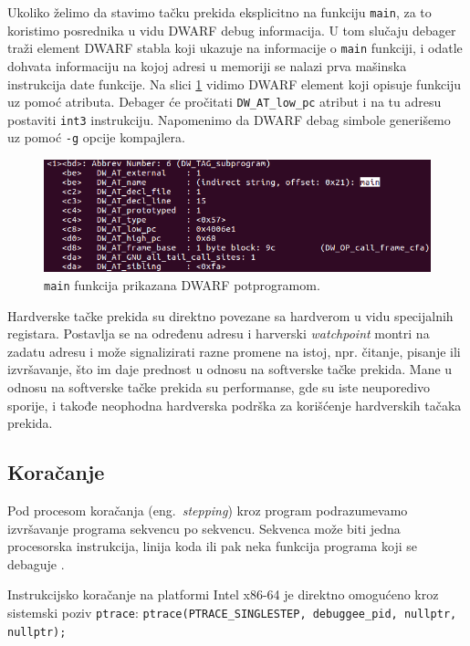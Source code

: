 \documentclass[12pt,oneside]{memoir}
\begin{document}
Ukoliko želimo da stavimo tačku prekida eksplicitno na funkciju \texttt{main}, za to koristimo posrednika u vidu DWARF debug informacija. U tom slučaju debager traži element DWARF stabla koji ukazuje na informacije o \texttt{main} funkciji, i odatle dohvata informaciju na kojoj adresi u memoriji se nalazi prva mašinska instrukcija date funkcije. Na slici \ref{fig:mainsub} vidimo DWARF element koji opisuje funkciju uz pomoć atributa. Debager će pročitati \texttt{DW\_AT\_low\_pc} atribut i na tu adresu postaviti \texttt{int3} instrukciju. Napomenimo da DWARF debag simbole generišemo uz pomoć \texttt{-g} opcije kompajlera.

\begin{figure}[h!]
	\begin{center}
		\includegraphics[scale=0.4]{slike/main_subprogram.png}
	\end{center}
	\caption{\texttt{main} funkcija prikazana DWARF potprogramom.}
	\label{fig:mainsub}
\end{figure}

Hardverske tačke prekida su direktno povezane sa hardverom u vidu specijalnih registara. Postavlja se na određenu adresu i harverski \emph{watchpoint} montri na zadatu adresu i može signalizirati razne promene na istoj, npr. čitanje, pisanje ili izvršavanje, što im daje prednost u odnosu na softverske tačke prekida. Mane u odnosu na softverske tačke prekida su performanse, gde su iste neuporedivo sporije, i takođe neophodna hardverska podrška za korišćenje hardverskih tačaka prekida.

\subsection{Koračanje}

Pod procesom koračanja (eng.~\emph{stepping}) kroz program podrazumevamo izvršavanje programa sekvencu po sekvencu. Sekvenca može biti jedna procesorska instrukcija, linija koda ili pak neka funkcija programa koji se debaguje \cite{GDB}.

Instrukcijsko koračanje na platformi Intel x86-64 je direktno omogućeno kroz sistemski poziv \texttt{ptrace}:\newline\newline
\texttt{ptrace(PTRACE\_SINGLESTEP, debuggee\_pid, nullptr, nullptr);}
\newline
\end{document}
